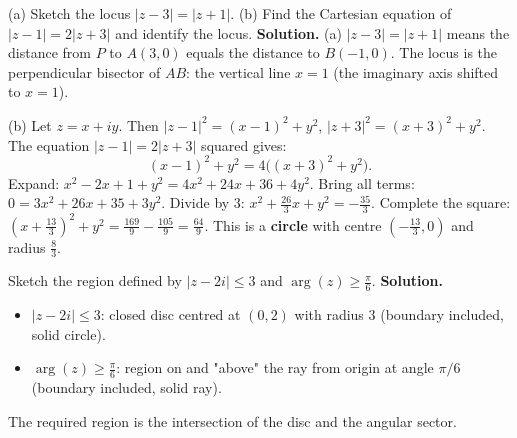 \documentclass[11pt]{article}
\newcommand{\legende}[1]{\par\vspace{6pt}{\popsemi\fontsize{9}{11.5}\selectfont\color{popmuted}#1}}
\begin{document}
\begin{exoresolu}
(a) Sketch the locus $|z - 3| = |z + 1|$.
(b) Find the Cartesian equation of $|z - 1| = 2|z + 3|$ and identify the locus.
\tcblower
\textbf{Solution.}
(a) $|z-3| = |z+1|$ means the distance from $P$ to $A(3,0)$ equals the distance to $B(-1,0)$. The locus is the perpendicular bisector of $AB$: the vertical line $x = 1$ (the imaginary axis shifted to $x=1$).

(b) Let $z = x+iy$. Then $|z-1|^2 = (x-1)^2+y^2$, $|z+3|^2 = (x+3)^2+y^2$.
The equation $|z-1| = 2|z+3|$ squared gives:
\[ (x-1)^2 + y^2 = 4\bigl((x+3)^2 + y^2\bigr). \]
Expand: $x^2 - 2x + 1 + y^2 = 4x^2 + 24x + 36 + 4y^2$.
Bring all terms: $0 = 3x^2 + 26x + 35 + 3y^2$.
Divide by $3$: $x^2 + \frac{26}{3}x + y^2 = -\frac{35}{3}$.
Complete the square: $\left(x + \frac{13}{3}\right)^2 + y^2 = \frac{169}{9} - \frac{105}{9} = \frac{64}{9}$.
This is a \textbf{circle} with centre $\left(-\frac{13}{3}, 0\right)$ and radius $\frac{8}{3}$.
\end{exoresolu}

\begin{exoresolu}
Sketch the region defined by $|z - 2i| \le 3$ and $\arg(z) \ge \frac{\pi}{6}$.
\tcblower
\textbf{Solution.}
\begin{itemize}
\item $|z - 2i| \le 3$: closed disc centred at $(0,2)$ with radius $3$ (boundary included, solid circle).
\item $\arg(z) \ge \frac{\pi}{6}$: region on and "above" the ray from origin at angle $\pi/6$ (boundary included, solid ray).
\end{itemize}
The required region is the intersection of the disc and the angular sector.
\begin{popfigure}
\legende{Region: $|z-2i|\le 3$ and $\arg z \ge \pi/6$.}
\end{popfigure}
\end{exoresolu}
\end{document}
